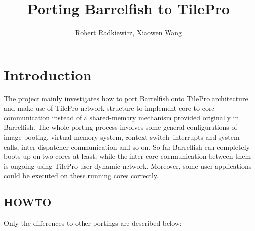 \documentclass[a4paper,twoside]{report} %
\title{Porting Barrelfish to TilePro} %
\author{Robert Radkiewicz, Xiaowen Wang} %
\begin{document}
\maketitle

%
%
\begin{versionhistory}
\end{versionhistory}



\newcommand{\note}[1]{[\textcolor{red}{\emph{#1}}]}
\newcommand{\Intf}{\texttt{/kernel/include/serial.h}\xspace}

\tableofcontents

\chapter{Introduction}

The project mainly investigates how to port Barrelfish onto TilePro architecture and make use of TilePro network structure to implement core-to-core communication instead of a shared-memory mechanism provided originally in Barrelfish. The whole porting process involves some general configurations of image booting, virtual memory system, context switch, interrupts and system calls, inter-dispatcher communication and so on. So far Barrelfish can completely boots up on two cores at least, while the inter-core communication between them is ongoing using TilePro user dynamic network. Moreover, some user applications could be executed on these running cores correctly.

\section{HOWTO}
Only the differences to other portings are described below:
\end{document}
